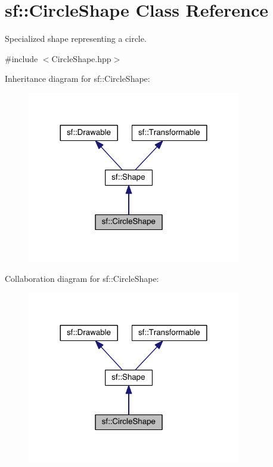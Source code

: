 \hypertarget{classsf_1_1_circle_shape}{\section{sf\-:\-:Circle\-Shape Class Reference}
\label{classsf_1_1_circle_shape}
}


Specialized shape representing a circle.  




{\ttfamily \#include $<$Circle\-Shape.\-hpp$>$}



Inheritance diagram for sf\-:\-:Circle\-Shape\-:
\nopagebreak
\begin{figure}[H]
\begin{center}
\leavevmode
\includegraphics[width=264pt]{classsf_1_1_circle_shape__inherit__graph}
\end{center}
\end{figure}


Collaboration diagram for sf\-:\-:Circle\-Shape\-:
\nopagebreak
\begin{figure}[H]
\begin{center}
\leavevmode
\includegraphics[width=264pt]{classsf_1_1_circle_shape__coll__graph}
\end{center}
\end{figure}
